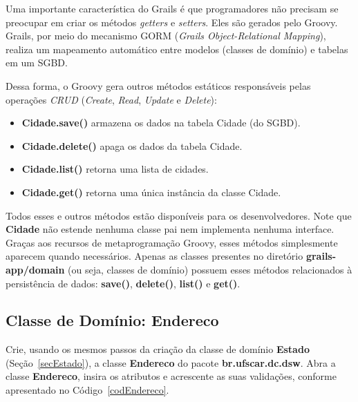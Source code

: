 \vspace{0.5cm}

\begin{cBox}
Uma  importante característica  do Grails  é que  programadores não  precisam se
preocupar em criar  os métodos {\it getters} e {\it  setters}.  Eles são gerados
pelo Groovy.  Grails, por meio  do mecanismo GORM ({\it Grails Object-Relational
  Mapping}), realiza um mapeamento automático entre modelos (classes
de domínio) e tabelas em um SGBD.

Dessa forma, o Groovy gera outros métodos estáticos responsáveis pelas operações
{\it CRUD} ({\it Create}, {\it Read}, {\it Update} e {\it Delete}): 

\begin{itemize}

\item {\bf Cidade.save()} armazena os dados na tabela Cidade (do SGBD).

\item {\bf Cidade.delete()} apaga os dados da tabela Cidade.

\item {\bf Cidade.list()} retorna uma lista de cidades.

\item {\bf Cidade.get()} retorna uma única instância da classe Cidade.

\end{itemize}

Todos esses  e outros métodos  estão disponíveis para os  desenvolvedores.  Note
que  {\bf  Cidade}  não  estende  nenhuma  classe  pai  nem  implementa  nenhuma
interface.   Graças  aos  recursos  de  metaprogramação  Groovy,  esses  métodos
simplesmente  aparecem  quando  necessários.   Apenas as  classes  presentes  no
diretório {\bf  grails-app/domain} (ou seja,  classes de domínio)  possuem esses
métodos relacionados à persistência de dados: {\bf save()}, {\bf delete()}, {\bf
  list()} e {\bf get()}.
\end{cBox}

\newpage

\subsection{Classe de Domínio: Endereco}\label{secEndereco}

\vspace{0.5cm}

Crie,  usando os  mesmos passos  da criação  da classe  de domínio  {\bf Estado}
(Seção~\ref{secEstado}),    a   classe   {\bf    Endereco}   do    pacote   {\bf
  br.ufscar.dc.dsw}.   Abra  a classe  {\bf  Endereco},  insira  os atributos  e
acrescente     as      suas     validações,     conforme      apresentado     no
Código~\ref{codEndereco}. 


